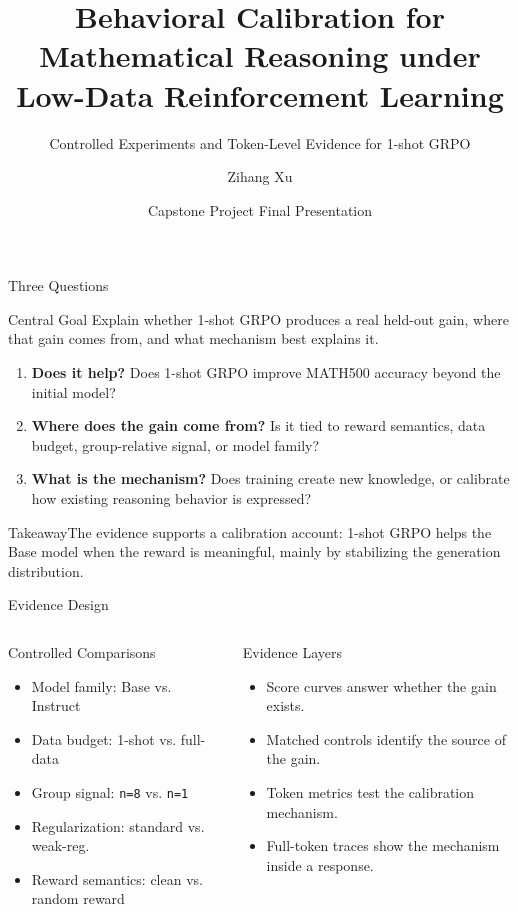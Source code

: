 \documentclass{beamer}
\title[Low-Data RLVR Calibration]{Behavioral Calibration for Mathematical Reasoning under Low-Data Reinforcement Learning}
\subtitle{Controlled Experiments and Token-Level Evidence for 1-shot GRPO}
\author[Zihang Xu]{Zihang Xu}
\institute[CUHK-Shenzhen]{Data Science, The Chinese University of Hong Kong, Shenzhen}
\date{Capstone Project Final Presentation}
\newcommand{\takeaway}[1]{\begin{block}{Takeaway}#1\end{block}}
\begin{document}
\begin{frame}
\titlepage
\end{frame}

\begin{frame}{Three Questions}
\begin{block}{Central Goal}
Explain whether 1-shot GRPO produces a real held-out gain, where that gain comes from, and what mechanism best explains it.
\end{block}

\begin{enumerate}
    \item \textbf{Does it help?} Does 1-shot GRPO improve MATH500 accuracy beyond the initial model?
    \item \textbf{Where does the gain come from?} Is it tied to reward semantics, data budget, group-relative signal, or model family?
    \item \textbf{What is the mechanism?} Does training create new knowledge, or calibrate how existing reasoning behavior is expressed?
\end{enumerate}

\takeaway{The evidence supports a calibration account: 1-shot GRPO helps the Base model when the reward is meaningful, mainly by stabilizing the generation distribution.}
\end{frame}

\begin{frame}[shrink=5]{Evidence Design}
\begin{columns}
\begin{block}{Controlled Comparisons}
\begin{itemize}
    \item Model family: Base vs. Instruct
    \item Data budget: 1-shot vs. full-data
    \item Group signal: \texttt{n=8} vs. \texttt{n=1}
    \item Regularization: standard vs. weak-reg.
    \item Reward semantics: clean vs. random reward
\end{itemize}
\end{block}

\begin{block}{Evidence Layers}
\begin{itemize}
    \item Score curves answer whether the gain exists.
    \item Matched controls identify the source of the gain.
    \item Token metrics test the calibration mechanism.
    \item Full-token traces show the mechanism inside a response.
\end{itemize}
\end{block}
\end{columns}
\end{frame}
\end{document}
